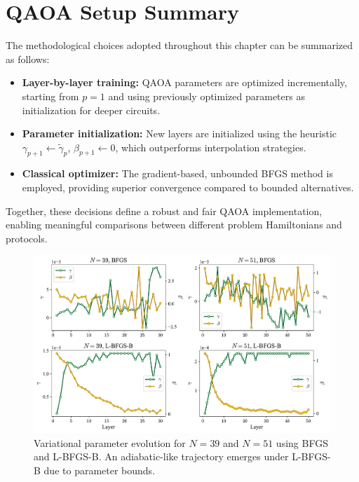 \section{QAOA Setup Summary}

The methodological choices adopted throughout this chapter can be summarized as follows:
\begin{itemize}
    \item \textbf{Layer-by-layer training:} QAOA parameters are optimized incrementally, starting from $p=1$ and using previously optimized parameters as initialization for deeper circuits.  
    \item \textbf{Parameter initialization:} New layers are initialized using the heuristic 
    $\gamma_{p+1} \leftarrow \widetilde{\gamma}_p$, $\beta_{p+1} \leftarrow 0$, which outperforms interpolation strategies.  
    \item \textbf{Classical optimizer:} The gradient-based, unbounded BFGS method is employed, providing superior convergence compared to bounded alternatives.  
\end{itemize}

Together, these decisions define a robust and fair QAOA implementation, enabling meaningful comparisons between different problem Hamiltonians and protocols.

\begin{figure}[h]
    \centering
    \includegraphics[width=1\textwidth]{03-methodology/figs/optimizer_parameters_comparison.pdf}
    \caption{Variational parameter evolution for $N=39$ and $N=51$ using BFGS and L-BFGS-B. An adiabatic-like trajectory emerges under L-BFGS-B due to parameter bounds.}
    \label{fig:optimizer_parameter_comparison}
\end{figure}